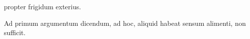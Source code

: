 \documentclass{article}
\begin{document}
\beginnumbering


\pstart
{} propter frigidum exterius.
\pend

\pstart
Ad primum argumentum dicendum,  ad hoc,
 aliquid habeat sensum
alimenti, non sufficit.
\pend
    \endnumbering

    
\end{document}
